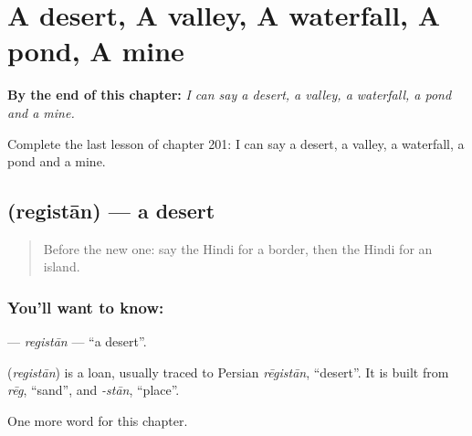 
\chapter{A desert, A valley, A waterfall, A pond, A mine}
\label{ch:hi-a-desert-a-valley-a-waterfall-a-pond-a-mine}

\begin{chapteropening}
\textbf{By the end of this chapter:} \emph{I can say a desert, a valley, a waterfall, a pond and a mine.}

Complete the last lesson of chapter 201: I can say a desert, a valley, a waterfall, a pond and a mine.
\end{chapteropening}

\section[\texorpdfstring{\hi{रेगिस्तान} (registān)}{रेगिस्तान (registān)}]{ (registān) — a desert}

\label{lesson:HI-C201-registan}



\begin{quote}
Before the new one: say the Hindi for a border, then the Hindi for an island.
\end{quote}

\subsection*{You'll want to know: }
\textbf{} — \emph{registān} — \textquotedblleft{}a desert\textquotedblright{}.

\begin{cousinweb}
\textbf{} (\emph{registān}) is a loan, usually traced to Persian \emph{rēgistān}, \textquotedblleft{}desert\textquotedblright{}. It is built from \emph{rēg}, \textquotedblleft{}sand\textquotedblright{}, and \emph{-stān}, \textquotedblleft{}place\textquotedblright{}.
\end{cousinweb}

\begin{grammarlens}[title={What you've built}]
One more word for this chapter.
\end{grammarlens}

